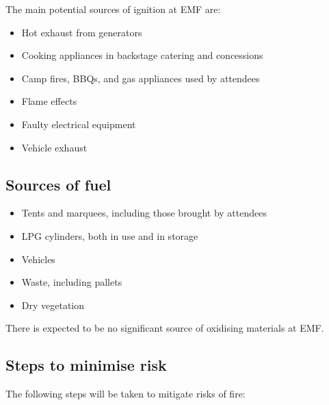 The main potential sources of ignition at EMF are:

\begin{itemize}
\tightlist
\item Hot exhaust from generators
\item Cooking appliances in backstage catering and concessions
\item Camp fires, BBQs, and gas appliances used by attendees
\item Flame effects
\item Faulty electrical equipment
\item Vehicle exhaust
\end{itemize}

\subsection{Sources of fuel}
\begin{itemize}
\tightlist
\item Tents and marquees, including those brought by attendees
\item LPG cylinders, both in use and in storage
\item Vehicles
\item Waste, including pallets
\item Dry vegetation
\end{itemize}

There is expected to be no significant source of oxidising materials at EMF.

\subsection{Steps to minimise risk}
The following steps will be taken to mitigate risks of fire:

